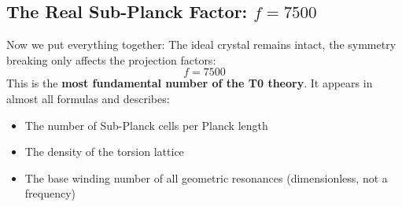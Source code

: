 	\subsection{The Real Sub-Planck Factor: \(f = 7500\)}
	Now we put everything together: The ideal crystal remains intact, the symmetry breaking only affects the projection factors:
	\begin{equation}
		\boxed{f = 7500}
	\end{equation}
	This is the \textbf{most fundamental number of the T0 theory}. It appears in almost all formulas and describes:
	\begin{itemize}
		\item The number of Sub-Planck cells per Planck length
		\item The density of the torsion lattice
		\item The base winding number of all geometric resonances (dimensionless, not a frequency)
	\end{itemize}
